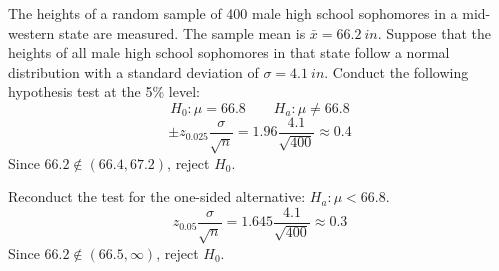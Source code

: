 \documentclass[letterpaper,12pt,fleqn]{article}
\newcommand{\m}{\mu}
\renewcommand{\o}{\sigma}
\begin{document}
\begin{example}
  The heights of a random sample of 400 male high school sophomores in a mid-western state are measured.  The sample mean
  is \(\bar{x}=\SI{66.2}{in}\).  Suppose that the heights of all male high school sophomores in that state follow a normal
  distribution with a standard deviation of \(\o=\SI{4.1}{in}\).  Conduct the following hypothesis test at the 5\% level:
  \[H_0:\m=66.8\qquad H_a:\m\ne66.8\]
  \[\pm z_{0.025}\frac{\o}{\sqrt{n}}=1.96\frac{4.1}{\sqrt{400}}\approx0.4\]
  Since \(66.2\notin(66.4,67.2)\), reject \(H_0\).

  Reconduct the test for the one-sided alternative: \(H_a:\m<66.8\).
  \[z_{0.05}\frac{\o}{\sqrt{n}}=1.645\frac{4.1}{\sqrt{400}}\approx0.3\]
  Since \(66.2\notin(66.5,\infty)\), reject \(H_0\).
\end{example}
\end{document}
